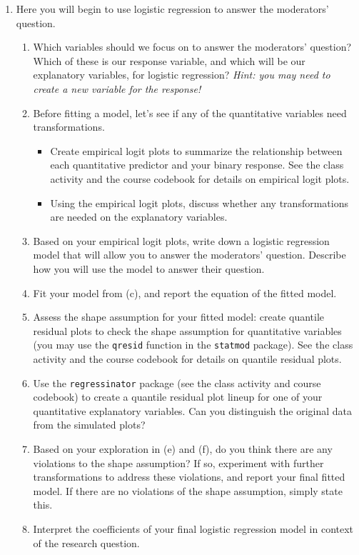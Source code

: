 \documentclass[11pt]{article}
\begin{document}
\begin{enumerate}
\item[2.] Here you will begin to use logistic regression to answer the moderators' question.

\begin{enumerate}
\item Which variables should we focus on to answer the moderators' question? Which of these is our response variable, and which will be our explanatory variables, for logistic regression? \textit{Hint: you may need to create a new variable for the response!}

\item Before fitting a model, let's see if any of the quantitative variables need transformations.
\begin{itemize}
\item Create empirical logit plots to summarize the relationship between each quantitative predictor and your binary response. See the class activity and the course codebook for details on empirical logit plots.
\item Using the empirical logit plots, discuss whether any transformations are needed on the explanatory variables.
\end{itemize}
\item Based on your empirical logit plots, write down a logistic regression model that will allow you to answer the moderators' question. Describe how you will use the model to answer their question.
\item Fit your model from (c), and report the equation of the fitted model.

\item Assess the shape assumption for your fitted model: create quantile residual plots to check the shape assumption for quantitative variables (you may use the \texttt{qresid} function in the \texttt{statmod} package). See the class activity and the course codebook for details on quantile residual plots.

\item Use the \texttt{regressinator} package (see the class activity and course codebook) to create a quantile residual plot lineup for one of your quantitative explanatory variables. Can you distinguish the original data from the simulated plots?

\item Based on your exploration in (e) and (f), do you think there are any violations to the shape assumption? If so, experiment with further transformations to address these violations, and report your final fitted model.  If there are no violations of the shape assumption, simply state this.

\item Interpret the coefficients of your final logistic regression model in context of the research question.

\end{enumerate} 
\end{enumerate}
\end{document}
